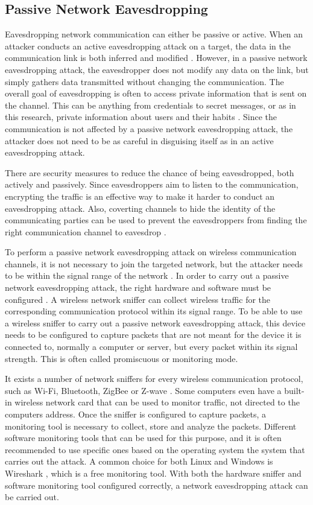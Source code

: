 \subsection{Passive Network Eavesdropping}
Eavesdropping network communication can either be passive or active. When an attacker conducts an active eavesdropping attack on a target, the data in the communication link is both inferred and modified \cite{Eavesdropping}. However, in a passive network eavesdropping attack, the eavesdropper does not modify any data on the link, but simply gathers data transmitted without changing the communication. The overall goal of eavesdropping is often to access private information that is sent on the channel. This can be anything from credentials to secret messages, or as in this research, private information about users and their habits \cite{Eavesdropping}. Since the communication is not affected by a passive network eavesdropping attack, the attacker does not need to be as careful in disguising itself as in an active eavesdropping attack.  

There are security measures to reduce the chance of being eavesdropped, both actively and passively. Since eavesdroppers aim to listen to the communication, encrypting the traffic is an effective way to make it harder to conduct an eavesdropping attack. Also, coverting channels to hide the identity of the communicating parties can be used to prevent the eavesdroppers from finding the right communication channel to eavesdrop \cite{Eavesdropping}.

To perform a passive network eavesdropping attack on wireless communication channels, it is not necessary to join the targeted network, but the attacker needs to be within the signal range of the network \cite{WifiEavesdropEnc}. In order to carry out a passive network eavesdropping attack, the right hardware and software must be configured \cite{Sniffingtech}. A wireless network sniffer can collect wireless traffic for the corresponding communication protocol within its signal range. To be able to use a wireless sniffer to carry out a passive network eavesdropping attack, this device needs to be configured to capture packets that are not meant for the device it is connected to, normally a computer or server, but every packet within its signal strength. This is often called promiscuous or monitoring mode. 

It exists a number of network sniffers for every wireless communication protocol, such as \gls{Wi-Fi}, Bluetooth, ZigBee or Z-wave \cite{Sniffingtech}. Some computers even have a built-in wireless network card that can be used to monitor traffic, not directed to the computers address. Once the sniffer is configured to capture packets, a monitoring tool is necessary to collect, store and analyze the packets. Different software monitoring tools that can be used for this purpose, and it is often recommended to use specific ones based on the operating system the system that carries out the attack. A common choice for both Linux and Windows is Wireshark \cite{Wireshark}, which is a free monitoring tool. With both the hardware sniffer and software monitoring tool configured correctly, a network eavesdropping attack can be carried out. 

